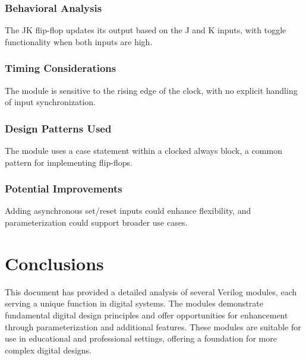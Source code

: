 \documentclass[10pt]{article}
\begin{document}
\subsubsection{Behavioral Analysis}
The JK flip-flop updates its output based on the J and K inputs, with toggle functionality when both inputs are high.

\subsubsection{Timing Considerations}
The module is sensitive to the rising edge of the clock, with no explicit handling of input synchronization.

\subsubsection{Design Patterns Used}
The module uses a case statement within a clocked always block, a common pattern for implementing flip-flops.

\subsubsection{Potential Improvements}
Adding asynchronous set/reset inputs could enhance flexibility, and parameterization could support broader use cases.

\section{Conclusions}

This document has provided a detailed analysis of several Verilog modules, each serving a unique function in digital systems. The modules demonstrate fundamental digital design principles and offer opportunities for enhancement through parameterization and additional features. These modules are suitable for use in educational and professional settings, offering a foundation for more complex digital designs.
\end{document}
